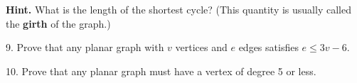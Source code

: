 \documentclass[10pt,]{book}
\newcommand{\terminology}[1]{\textbf{#1}}
\theoremstyle{plain}
\theoremstyle{definition}
\theoremstyle{definition}
\theoremstyle{definition}
\theoremstyle{definition}
\numberwithin{equation}{chapter}
\begin{document}
\begin{exerciselist}
{%
}%
\par\smallskip
\par\smallskip%
\noindent\textbf{Hint.}\hypertarget{hint-11}{}\quad%
\hypertarget{p-1637}{}%
What is the length of the shortest cycle?  (This quantity is usually called the \terminology{girth} of the graph.)%
\item[9.]\hypertarget{exercise-187}{}\hypertarget{p-1638}{}%
Prove that any planar graph with \(v\) vertices and \(e\) edges satisfies \(e \le 3v - 6\).%
\par\smallskip
\item[10.]\hypertarget{exercise-188}{}\hypertarget{p-1640}{}%
Prove that any planar graph must have a vertex of degree 5 or less.%
\par\smallskip
\end{exerciselist}
\typeout{************************************************}
\typeout{************************************************}
\end{document}
